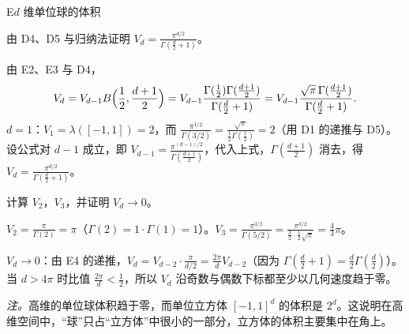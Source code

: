 \begin{probleme}{E}{$d$ 维单位球的体积}
\begin{questions}
\item 由 D4、D5 与归纳法证明 $V_d=\frac{\pi^{d/2}}{\Gamma(\frac d2+1)}$。
\begin{solution}
由 E2、E3 与 D4，
\[
V_d=V_{d-1}B\Bigl(\frac12,\frac{d+1}2\Bigr)=V_{d-1}\frac{\Gamma(\frac12)\Gamma(\frac{d+1}2)}{\Gamma(\frac d2+1)}=V_{d-1}\frac{\sqrt\pi\,\Gamma(\frac{d+1}2)}{\Gamma(\frac d2+1)}.
\]
$d=1$：$V_1=\lambda([-1,1])=2$，而 $\frac{\pi^{1/2}}{\Gamma(3/2)}=\frac{\sqrt\pi}{\frac12\Gamma(\frac12)}=2$（用 D1 的递推与 D5）。设公式对 $d-1$ 成立，即 $V_{d-1}=\frac{\pi^{(d-1)/2}}{\Gamma(\frac{d+1}2)}$，代入上式，$\Gamma(\frac{d+1}2)$ 消去，得 $V_d=\frac{\pi^{d/2}}{\Gamma(\frac d2+1)}$。
\end{solution}

\item 计算 $V_2$，$V_3$，并证明 $V_d\to0$。
\begin{solution}
$V_2=\frac\pi{\Gamma(2)}=\pi$（$\Gamma(2)=1\cdot\Gamma(1)=1$）。$V_3=\frac{\pi^{3/2}}{\Gamma(5/2)}=\frac{\pi^{3/2}}{\frac32\cdot\frac12\sqrt\pi}=\frac43\pi$。

$V_d\to0$：由 E4 的递推，$V_d=V_{d-2}\cdot\frac{\pi}{d/2}=\frac{2\pi}dV_{d-2}$（因为 $\Gamma(\frac d2+1)=\frac d2\Gamma(\frac d2)$）。当 $d>4\pi$ 时比值 $\frac{2\pi}d<\frac12$，所以 $V_d$ 沿奇数与偶数下标都至少以几何速度趋于零。

\emph{注。}高维的单位球体积趋于零，而单位立方体 $[-1,1]^d$ 的体积是 $2^d$。这说明在高维空间中，“球”只占“立方体”中很小的一部分，立方体的体积主要集中在角上。
\end{solution}
\end{questions}
\end{probleme}
